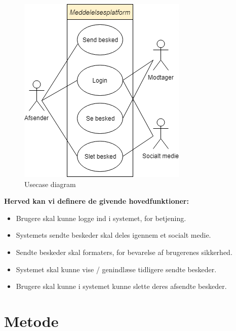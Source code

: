 \begin{table}[H]
    \begin{minipage}{.5\textwidth}
        \begin{figure}[H]
            \centering
            \includegraphics[width=0.85\linewidth]{Projectdoc/Assets/Illustrationer/simple-usecase.png}
            \caption{Usecase diagram}
            \label{fig:usecase}
        \end{figure}
    \end{minipage}
    \begin{minipage}{.5\textwidth}
        \textbf{Herved kan vi definere de givende hovedfunktioner:}
        \begin{itemize}
            \item Brugere skal kunne logge ind i systemet, for betjening.
            \item Systemets sendte beskeder skal deles igennem et socialt medie.
            \item Sendte beskeder skal formaters, for bevarelse af brugerenes sikkerhed.
            \item Systemet skal kunne vise / genindlæse tidligere sendte beskeder.
            \item Brugere skal kunne i systemet kunne slette deres afsendte beskeder.
        \end{itemize}
    \end{minipage}
\end{table}


\section{Metode}